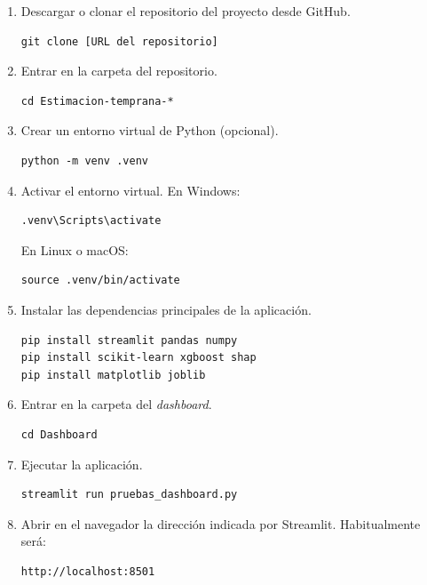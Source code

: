 \documentclass[
  spanish,
  a4paper,
  12pt,
  twoside]{memoir}
\begin{document}
\begin{enumerate}
  \item Descargar o clonar el repositorio del proyecto desde GitHub.

\begin{verbatim}
git clone [URL del repositorio]
\end{verbatim}

  \item Entrar en la carpeta del repositorio.

\begin{verbatim}
cd Estimacion-temprana-*
\end{verbatim}

  \item Crear un entorno virtual de Python (opcional).

\begin{verbatim}
python -m venv .venv
\end{verbatim}

  \item Activar el entorno virtual. En Windows:

\begin{verbatim}
.venv\Scripts\activate
\end{verbatim}

  En Linux o macOS:

\begin{verbatim}
source .venv/bin/activate
\end{verbatim}

  \item Instalar las dependencias principales de la aplicación.

\begin{verbatim}
pip install streamlit pandas numpy
pip install scikit-learn xgboost shap
pip install matplotlib joblib
\end{verbatim}

  \item Entrar en la carpeta del \textit{dashboard}.

\begin{verbatim}
cd Dashboard
\end{verbatim}

  \item Ejecutar la aplicación.

\begin{verbatim}
streamlit run pruebas_dashboard.py
\end{verbatim}

  \item Abrir en el navegador la dirección indicada por Streamlit. Habitualmente será:

\begin{verbatim}
http://localhost:8501
\end{verbatim}
\end{enumerate}
\end{document}
